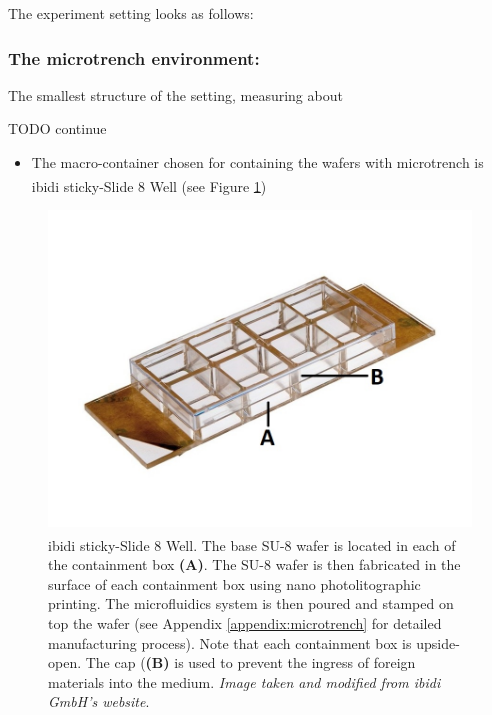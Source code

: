 \documentclass[pdftex,12pt,a4paper]{report}
\begin{document}
The experiment setting looks as follows:

\subsubsection*{The microtrench environment:}

The smallest structure of the setting, measuring about 

TODO continue

\begin{itemize}
\item The macro-container chosen for containing the wafers with microtrench is ibidi\textsuperscript{\textregistered} sticky-Slide 8 Well (see Figure \ref{fig:ibidi})
\end{itemize}

\begin{figure}[h]
\centering
\includegraphics[width=1\textwidth]{images/sticky-slide-8-well-marked}
\caption{ibidi\textsuperscript{\textregistered} sticky-Slide 8 Well. The base SU-8 wafer is located in each of the containment box \textbf{(A)}. The SU-8 wafer is then fabricated in the surface of each containment box using nano photolitographic printing. The microfluidics system is then poured and stamped on top the wafer (see Appendix \ref{appendix:microtrench} for detailed manufacturing process). Note that each containment box is upside-open. The cap (\textbf{(B)} is used to prevent the ingress of foreign materials into the medium. \textit{Image taken and modified from ibidi GmbH's website}.}
\label{fig:ibidi}
\end{figure}
\end{document}
